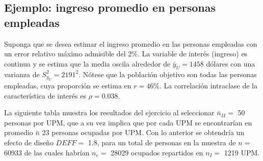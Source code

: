 \hypertarget{ejemplo-ingreso-promedio-en-personas-empleadas}{%
\subsection{Ejemplo: ingreso promedio en personas empleadas}\label{ejemplo-ingreso-promedio-en-personas-empleadas}}

Suponga que se desea estimar el ingreso promedio en las personas empleadas con un error relativo máximo admisible del 2\%. La variable de interés (ingreso) es continua y se estima que la media oscila alrededor de \(\bar{y}_U=1458\) dólares con una varianza de \(S^2_{y_U}=2191^2\). Nótese que la población objetivo son todas las personas empleadas, cuya proporción se estima en \(r = 46\)\%. La correlación intraclase de la característica de interés es \(\rho = 0.038\).

La siguiente tabla muestra los resultados del ejercicio al seleccionar \(\bar{n}_{II} =\) 50 personas por UPM, que a su vez implica que por cada UPM se encontrarían en promedio \(\bar{n}\) 23 personas ocupadas por UPM. Con lo anterior se obtendría un efecto de diseño \(DEFF =\) 1.8, para un total de personas en la muestra de \(n =\) 60933 de las cuales habrían \(n_e =\) 28029 ocupados repartidos en \(n_{I} =\) 1219 UPM.

